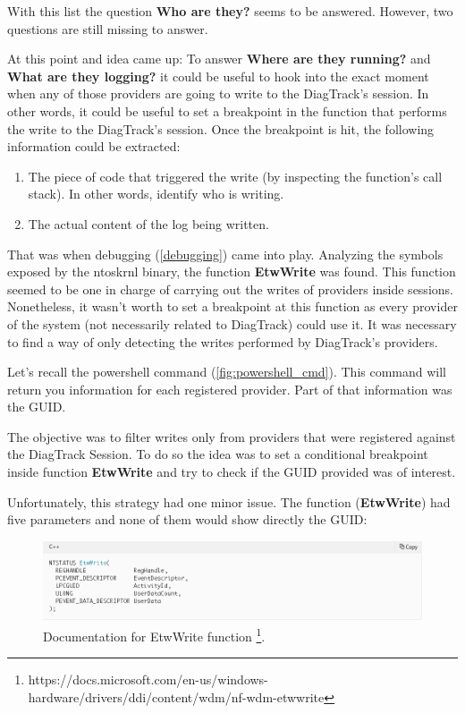 With this list the question {\bfseries Who are they?} seems to be answered. However, two questions are still missing to answer.

At this point and idea came up: To answer {\bfseries Where are they running?} and {\bfseries What are they logging?} it could be useful to hook into the exact moment when any of those providers are going to write to the DiagTrack's session. 
In other words, it could be useful to set a breakpoint in the function that performs the write to the DiagTrack's session. Once the breakpoint is hit, the following information could be extracted:

\begin{enumerate}
\setlength\itemsep{0.05em}
\item The piece of code that triggered the write (by inspecting the function's call stack). In other words, identify who is writing. 
\item The actual content of the log being written.
\end{enumerate} 

That was when debugging (\ref{debugging}) came into play. Analyzing the symbols exposed by the ntoskrnl binary, the function {\bfseries EtwWrite} was found. This function seemed to be one in charge of carrying out the writes of providers inside sessions. Nonetheless, it wasn't worth to set a breakpoint at this function as every provider of the system (not necessarily related to DiagTrack) could use it. 
It was necessary to find a way of only detecting the writes performed by DiagTrack's providers. 

Let's recall the powershell command (\ref{fig:powershell_cmd}). This command will return you information for each registered provider. Part of that information was the GUID. 

The objective was to filter writes only from providers that were registered against the DiagTrack Session. To do so the idea was to set a conditional breakpoint inside function {\bfseries EtwWrite} and try to check if the GUID provided was of interest.

Unfortunately, this strategy had one minor issue. The function ({\bfseries EtwWrite}) had five parameters and none of them would show directly the GUID:

\begin{figure}[H]
  \includegraphics[width=\linewidth]{images/etw_write_docu.png}
  \caption[]{Documentation for EtwWrite function \footnote{https://docs.microsoft.com/en-us/windows-hardware/drivers/ddi/content/wdm/nf-wdm-etwwrite}. }
  \label{fig:etw_write_docu}
\end{figure}

